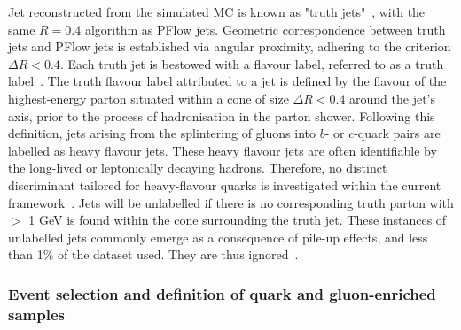 Jet reconstructed from the simulated MC is known as "truth jets"~\cite{ATLAS:2020cli}, with the same \antikt $R=0.4$ algorithm as PFlow jets. Geometric correspondence between truth jets and PFlow jets is established via angular proximity, adhering to the criterion $\Delta R < 0.4$. Each truth jet is bestowed with a flavour label, referred to as a truth label~\cite{Aad_2014,ATL-PHYS-PUB-2017-009}. The truth flavour label attributed to a jet is defined by the flavour of the highest-energy parton situated within a cone of size $\Delta R < 0.4$ around the jet's axis, prior to the process of hadronisation in the parton shower. Following this definition, jets arising from the splintering of gluons into $b$- or $c$-quark pairs are labelled as heavy flavour jets. These heavy flavour jets are often identifiable by the long-lived or leptonically decaying hadrons. Therefore, no distinct discriminant tailored for heavy-flavour quarks is investigated within the current framework~\cite{CDF:2008ixu,ATLAS:2013uet}. Jets will be unlabelled if there is no corresponding truth parton with \pt $>$ 1 GeV is found within the cone surrounding the truth jet. These instances of unlabelled jets commonly emerge as a consequence of pile-up effects, and less than 1\% of the dataset used. They are thus ignored~\cite{ATLAS:2012mwf}.
 
 






\subsubsection{Event selection and definition of quark and gluon-enriched samples}
\label{subsec:Event}

